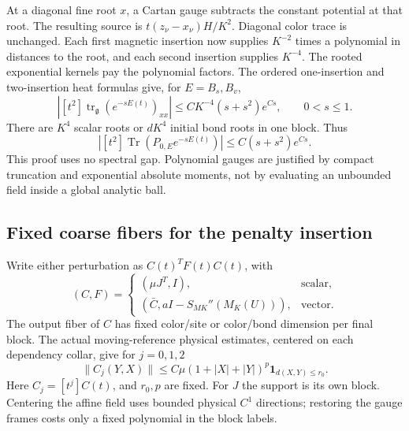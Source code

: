 At a diagonal fine root $x$, a Cartan gauge subtracts the constant
potential at that root. The resulting source is
$t(z_\nu-x_\nu)H/K^2$. Diagonal color trace is unchanged.
Each first magnetic insertion now supplies $K^{-2}$ times a polynomial
in distances to the root, and each second insertion supplies $K^{-4}$.
The rooted exponential kernels pay the polynomial factors. The ordered
one-insertion and two-insertion heat formulas give, for $E=B_s,B_v$,
\begin{equation}
 \left|[t^2]\operatorname{tr}_{\mathfrak g}
      (e^{-sE(t)})_{xx}\right|
       \le CK^{-4}(s+s^2)e^{Cs},\qquad 0<s\le1.
 \label{suv-fine-root}
\end{equation}
There are $K^4$ scalar roots or $dK^4$ initial bond roots in one block.
Thus
\begin{equation}
 \left|[t^2]\operatorname{Tr}(P_{0,E}e^{-sE(t)})\right|
       \le C(s+s^2)e^{Cs}.
 \label{suv-base-bound}
\end{equation}
This proof uses no spectral gap. Polynomial gauges are justified by
compact truncation and exponential absolute moments, not by evaluating
an unbounded field inside a global analytic ball.

\subsection{Fixed coarse fibers for the penalty insertion}
\label{suv-penalty-section}

Write either perturbation as $C(t)^TF(t)C(t)$, with
\begin{equation}
 (C,F)=
 \begin{cases}
   (\mu J^T,I),&\text{scalar},\\
   (\bar C,aI-S_{MK}''(M_K(U))),&\text{vector}.
 \end{cases}
 \label{suv-factor-table}
\end{equation}
The output fiber of $C$ has fixed color/site or color/bond dimension
per final block. The actual moving-reference physical estimates,
centered on each dependency collar, give for $j=0,1,2$
\begin{equation}
 \|C_j(Y,X)\|\le C\mu(1+|X|+|Y|)^p
                         \mathbf1_{d(X,Y)\le r_0}.
 \label{suv-C-jets}
\end{equation}
Here $C_j=[t^j]C(t)$, and $r_0,p$ are fixed. For $J$ the support
is its own block. Centering the affine field uses bounded physical
$C^1$ directions; restoring the gauge frames costs only a fixed
polynomial in the block labels.

